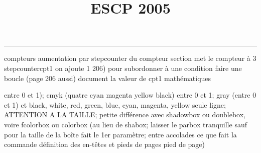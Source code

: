 \documentclass[11pt]{article}%
\title{\bf \vspace{-2cm} ESCP 2005} %
\author{} %
\date{} %
\renewcommand{\headrulewidth}{0pt}%
\renewcommand{\footrulewidth}{0.4pt}%
\begin{document}
\maketitle %
\vspace{-1.4cm}\hrule %
\thispagestyle{fancy}

\vspace*{.2cm}



compteurs%
aumentation par stepcounter du compteur section%
met le compteur à 3%
stepcounter{cpt1} on ajoute 1%
206) pour subordonner à une condition %
faire une boucle (page 206 aussi) %
document la valeur de cpt1 
mathématiques\newcommand{\ch}{\operatorname{ch}} 
\newcommand{\sh}{\operatorname{sh}}
\renewcommand{\tanh}{\operatorname{th}}
\renewcommand{\sinh}{\operatorname{sh}}
\renewcommand{\cosh}{\operatorname{ch}}
\newcommand{\argsh}{\operatorname{argsh}}
\newcommand{\argch}{\operatorname{argch}}
\newcommand{\argth}{\operatorname{argth}}
\newcommand{\ker}{\operatorname{Ker}}
\renewcommand{\im}{\operatorname{Im}}
\newcommand{\rg}{\operatorname{rg}}
\newcommand{\Id}{\operatorname{Id}}
\newcommand{\id}{\operatorname{id}}
\renewcommand{\leq}{\leq}
\renewcommand{\geq}{\geq }

entre 0 et 1); cmyk (quatre cyan magenta yellow black) entre 0 et 1;
gray (entre 0 et 1) et black, white, red, green, blue, cyan, magenta,
yellow%
seule ligne; ATTENTION A LA TAILLE; petite différence avec shadowbox ou
doublebox, voire fcolorbox ou colorbox (au lieu de shabox; laisser le
parbox tranquille sauf pour la taille de la boîte
\newcommand{\Tbox}[1]{\begin{center} \shabox{\parbox{0.6
\linewidth}{#1}} \end{center}} %
fait le 1er paramètre; entre accolades ce que fait la commande
définition des en-têtes et pieds de pages\pagestyle{fancy}
\chead{}
\rfoot[ \ \thepage]{\thepage}
\cfoot{}
\lfoot{}
\thispagestyle{fancy} %
pied de page)\renewcommand{\footrulewidth}{0.4pt}
\renewcommand{\headrulewidth}{0.4pt}
\end{document}
